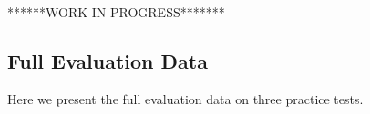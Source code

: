 \documentclass[pageno]{jpaper}
\begin{document}
******WORK IN PROGRESS*******

\subsection{Full Evaluation Data}
\label{Full Evaluation Data}
Here we present the full evaluation data on three practice tests.

%
\end{document}
